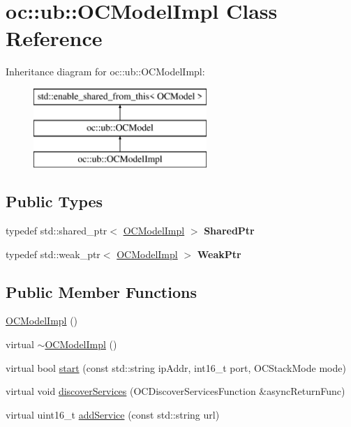 \hypertarget{classoc_1_1ub_1_1OCModelImpl}{}\section{oc\+:\+:ub\+:\+:O\+C\+Model\+Impl Class Reference}
\label{classoc_1_1ub_1_1OCModelImpl}
Inheritance diagram for oc\+:\+:ub\+:\+:O\+C\+Model\+Impl\+:\begin{figure}[H]
\begin{center}
\leavevmode
\includegraphics[height=3.000000cm]{classoc_1_1ub_1_1OCModelImpl}
\end{center}
\end{figure}
\subsection*{Public Types}
\begin{DoxyCompactItemize}
\item 
\hypertarget{classoc_1_1ub_1_1OCModelImpl_a5b323ffe75d8614854b0aa8b83fdf0e4}{}typedef std\+::shared\+\_\+ptr$<$ \hyperlink{classoc_1_1ub_1_1OCModelImpl}{O\+C\+Model\+Impl} $>$ {\bfseries Shared\+Ptr}\label{classoc_1_1ub_1_1OCModelImpl_a5b323ffe75d8614854b0aa8b83fdf0e4}

\item 
\hypertarget{classoc_1_1ub_1_1OCModelImpl_a0b39ccd354aa7b2b521cba85b87948e4}{}typedef std\+::weak\+\_\+ptr$<$ \hyperlink{classoc_1_1ub_1_1OCModelImpl}{O\+C\+Model\+Impl} $>$ {\bfseries Weak\+Ptr}\label{classoc_1_1ub_1_1OCModelImpl_a0b39ccd354aa7b2b521cba85b87948e4}

\end{DoxyCompactItemize}
\subsection*{Public Member Functions}
\begin{DoxyCompactItemize}
\item 
\hyperlink{classoc_1_1ub_1_1OCModelImpl_ab30a99e6992ef75e5dd604507c0e4c69}{O\+C\+Model\+Impl} ()
\item 
virtual \hyperlink{classoc_1_1ub_1_1OCModelImpl_a116c96f3e9c1daa9d82608b4420ae7ff}{$\sim$\+O\+C\+Model\+Impl} ()
\item 
virtual bool \hyperlink{classoc_1_1ub_1_1OCModelImpl_a7c6ce055a165c371b1d193464510d94b}{start} (const std\+::string ip\+Addr, int16\+\_\+t port, O\+C\+Stack\+Mode mode)
\item 
virtual void \hyperlink{classoc_1_1ub_1_1OCModelImpl_a246179adaa5c8cd2288ef80f85a940dd}{discover\+Services} (O\+C\+Discover\+Services\+Function \&async\+Return\+Func)
\item 
virtual uint16\+\_\+t \hyperlink{classoc_1_1ub_1_1OCModelImpl_af4266972dedd3e3e3955f57795692d63}{add\+Service} (const std\+::string url)
\end{DoxyCompactItemize}
